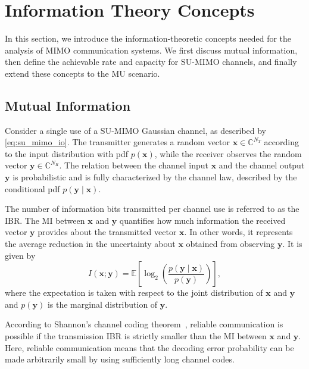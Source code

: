 \section{Information Theory Concepts}
\label{section:information_theory_concepts}

In this section, we introduce the information-theoretic concepts needed for the analysis of \ac{MIMO} communication systems. We first discuss mutual information, then define the achievable rate and capacity for \ac{SU}-\ac{MIMO} channels, and finally extend these concepts to the \ac{MU} scenario.

\subsection{Mutual Information}
\label{subsection:mutual_information}

Consider a single use of a \ac{SU}-\ac{MIMO} Gaussian channel, as described by \eqref{eq:su_mimo_io}.
The transmitter generates a random vector $\mathbf{x} \in \mathbb{C}^{N_T}$ according to the input distribution with \ac{pdf} $p(\mathbf{x})$, while the receiver observes the random vector $\mathbf{y} \in \mathbb{C}^{N_R}$.
The relation between the channel input $\mathbf{x}$ and the channel output $\mathbf{y}$ is probabilistic and is fully characterized by the channel law, described by the conditional \ac{pdf} $p(\mathbf{y} \mid \mathbf{x})$.

The number of information bits transmitted per channel use is referred to as the \ac{IBR}.
The \ac{MI} between $\mathbf{x}$ and $\mathbf{y}$ quantifies how much information the received vector $\mathbf{y}$ provides about the transmitted vector $\mathbf{x}$.
In other words, it represents the average reduction in the uncertainty about $\mathbf{x}$ obtained from observing $\mathbf{y}$. It is given by
\begin{equation}
\label{eq:mutual_information_su_mimo}
    I(\mathbf{x};\mathbf{y})
    = \mathbb{E}\!\left[ \log_2\!\left( \frac{p(\mathbf{y}\mid\mathbf{x})}{p(\mathbf{y})} \right) \right],
\end{equation}
where the expectation is taken with respect to the joint distribution of $\mathbf{x}$ and $\mathbf{y}$ and $p(\mathbf{y})$ is the marginal distribution of $\mathbf{y}$.

According to Shannon's channel coding theorem~\cite{shannon_1948}, reliable communication is possible if the transmission \ac{IBR} is strictly smaller than the \ac{MI} between $\mathbf{x}$ and $\mathbf{y}$.
Here, reliable communication means that the decoding error probability can be made arbitrarily small by using sufficiently long channel codes.

